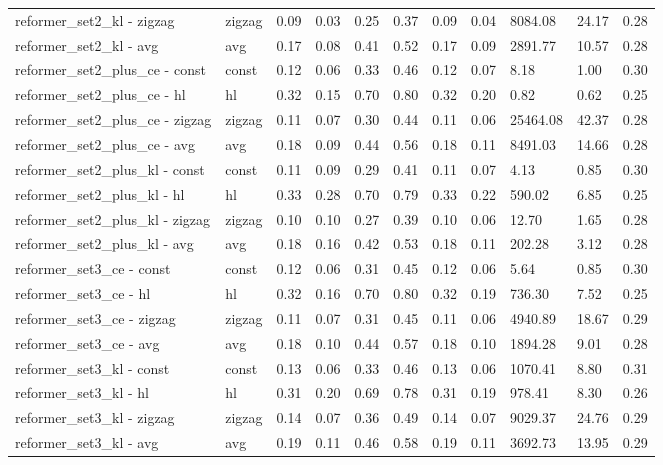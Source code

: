 \begin{longtable}{|p{1.3cm}|p{1.3cm}|p{1.3cm}|p{1.3cm}|p{1.3cm}|p{1.3cm}|p{1.3cm}|p{1.3cm}|p{1.3cm}|p{1.3cm}|p{1.3cm}|}
reformer_set2_kl - zigzag & zigzag & 0.09 & 0.03 & 0.25 & 0.37 & 0.09 & 0.04 & 8084.08 & 24.17 & 0.28 \\
reformer_set2_kl - avg & avg & 0.17 & 0.08 & 0.41 & 0.52 & 0.17 & 0.09 & 2891.77 & 10.57 & 0.28 \\
reformer_set2_plus_ce - const & const & 0.12 & 0.06 & 0.33 & 0.46 & 0.12 & 0.07 & 8.18 & 1.00 & 0.30 \\
reformer_set2_plus_ce - hl & hl & 0.32 & 0.15 & 0.70 & 0.80 & 0.32 & 0.20 & 0.82 & 0.62 & 0.25 \\
reformer_set2_plus_ce - zigzag & zigzag & 0.11 & 0.07 & 0.30 & 0.44 & 0.11 & 0.06 & 25464.08 & 42.37 & 0.28 \\
reformer_set2_plus_ce - avg & avg & 0.18 & 0.09 & 0.44 & 0.56 & 0.18 & 0.11 & 8491.03 & 14.66 & 0.28 \\
reformer_set2_plus_kl - const & const & 0.11 & 0.09 & 0.29 & 0.41 & 0.11 & 0.07 & 4.13 & 0.85 & 0.30 \\
reformer_set2_plus_kl - hl & hl & 0.33 & 0.28 & 0.70 & 0.79 & 0.33 & 0.22 & 590.02 & 6.85 & 0.25 \\
reformer_set2_plus_kl - zigzag & zigzag & 0.10 & 0.10 & 0.27 & 0.39 & 0.10 & 0.06 & 12.70 & 1.65 & 0.28 \\
reformer_set2_plus_kl - avg & avg & 0.18 & 0.16 & 0.42 & 0.53 & 0.18 & 0.11 & 202.28 & 3.12 & 0.28 \\
reformer_set3_ce - const & const & 0.12 & 0.06 & 0.31 & 0.45 & 0.12 & 0.06 & 5.64 & 0.85 & 0.30 \\
reformer_set3_ce - hl & hl & 0.32 & 0.16 & 0.70 & 0.80 & 0.32 & 0.19 & 736.30 & 7.52 & 0.25 \\
reformer_set3_ce - zigzag & zigzag & 0.11 & 0.07 & 0.31 & 0.45 & 0.11 & 0.06 & 4940.89 & 18.67 & 0.29 \\
reformer_set3_ce - avg & avg & 0.18 & 0.10 & 0.44 & 0.57 & 0.18 & 0.10 & 1894.28 & 9.01 & 0.28 \\
reformer_set3_kl - const & const & 0.13 & 0.06 & 0.33 & 0.46 & 0.13 & 0.06 & 1070.41 & 8.80 & 0.31 \\
reformer_set3_kl - hl & hl & 0.31 & 0.20 & 0.69 & 0.78 & 0.31 & 0.19 & 978.41 & 8.30 & 0.26 \\
reformer_set3_kl - zigzag & zigzag & 0.14 & 0.07 & 0.36 & 0.49 & 0.14 & 0.07 & 9029.37 & 24.76 & 0.29 \\
reformer_set3_kl - avg & avg & 0.19 & 0.11 & 0.46 & 0.58 & 0.19 & 0.11 & 3692.73 & 13.95 & 0.29 \\
\hline
\end{longtable}